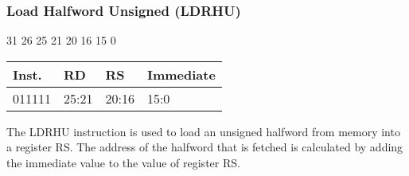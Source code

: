 \documentclass[12pt]{article}
\begin{document}

    \newpage
    \subsubsection{Load Halfword Unsigned (LDRHU)}
    
    \hspace{1.6cm}31 \hspace{1.15cm}26 \hspace{.05cm}25 \hspace{.8cm}21 \hspace{.05cm}20 \hspace{.8cm}16 \hspace{.05cm}15 \hspace{6.4cm}0
    \vspace{-.25cm}
    \begin{center}
        \begin{tabular}{ |p{1.8cm}|p{1.5cm}|p{1.5cm}|p{6.8cm}| }
            \hline
            \textbf{Inst.} & \textbf{RD} &  \textbf{RS} & \textbf{Immediate}\\
            \hline
            011111& 25:21 & 20:16 &15:0\\
            \hline
        \end{tabular}
    \end{center}
    
    \noindent
    The LDRHU instruction is used to load an unsigned halfword from memory into a register RS. The address of the halfword that is fetched is calculated by adding the immediate value to the value of register RS. 
    
\end{document}
